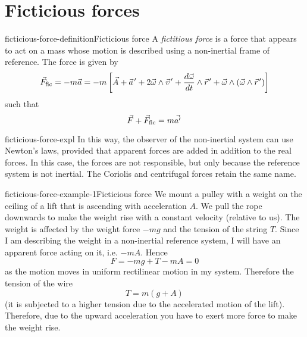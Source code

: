 \documentclass[preview]{standalone}
\newcommand{\pvec}[1]{\vec{#1}\mkern2mu\vphantom{#1}}
\begin{document}
\genpage

\section{Ficticious forces}

\begin{snippetdefinition}{ficticious-force-definition}{Ficticious force}
    A \emph{fictitious force} is a force that appears to act on a mass whose
    motion is described using a non-inertial frame of reference.
    The force is given by
    \[
        \vec{F}_\text{fic} = -m\vec{a} = -m \left[\vec{A} + \pvec{a}' + 2 \vec{\omega} \wedge \pvec{v}' + \frac{d\vec{\omega}}{dt} \wedge \pvec{r}'
        + \vec{\omega} \wedge (\vec{\omega} \wedge \pvec{r}') \right]
    \]
    such that
    \[
        \vec{F} + \vec{F}_\text{fic} = m \pvec{a'}
    \]
\end{snippetdefinition}

\begin{snippet}{ficticious-force-expl}
    In this way, the observer of the non-inertial system can use Newton's laws,
    provided that apparent forces are added in addition to the real forces.
    In this case, the forces are not responsible, but only because the reference system
    is not inertial.
    The Coriolis and centrifugal forces retain the same name.
\end{snippet}

\begin{snippetexample}{ficticious-force-example-1}{Ficticious force}
    We mount a pulley with a weight on the ceiling of a lift that is ascending with acceleration \(A\).
    We pull the rope downwards to make the weight rise with a constant velocity
    (relative to us).
    The weight is affected by the weight force \(-mg\) and the tension of the string \(T\).
    Since I am describing the weight in a non-inertial reference system, I will have
    an apparent force acting on it, i.e. \(-mA\).
    Hence
    \[
        F = -mg + T - mA = 0
    \]
    as the motion moves in uniform rectilinear motion in my system.
    Therefore the tension of the wire
    \[
        T = m(g+A)
    \]
    (it is subjected to a higher tension due to the accelerated motion of the lift).
    Therefore, due to the upward acceleration you have to exert more force to make the weight rise.
\end{snippetexample}
\end{document}
